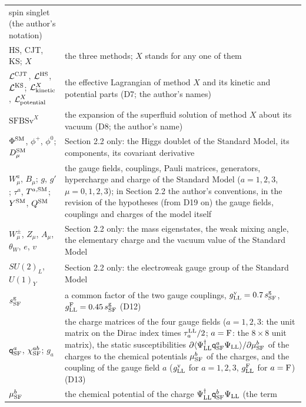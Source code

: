 \documentclass[
  10pt,
]{article}
\begin{document}
\begin{longtable}[]{@{}
  >{\raggedright\arraybackslash}p{}
  >{\raggedright\arraybackslash}p{}@{}}
spin singlet (the author's notation) \\
HS, CJT, KS; \(X\) & the three methods; \(X\) stands for any one of
them \\
\(\mathcal L^{\rm CJT}\), \(\mathcal L^{\rm HS}\),
\(\mathcal L^{\rm KS}\); \(\mathcal L^X_{\rm kinetic}\),
\(\mathcal L^X_{\rm potential}\) & the effective Lagrangian of method
\(X\) and its kinetic and potential parts (D7; the author's names) \\
\(\mathrm{SFBSv}^X\) & the expansion of the superfluid solution of
method \(X\) about its vacuum (D8; the author's name) \\
\(\Phi^{\rm SM}\), \(\phi^+\), \(\phi^0\); \(D^{\rm SM}_\mu\) & Section
2.2 only: the Higgs doublet of the Standard Model, its components, its
covariant derivative \\
\(W^a_\mu\), \(B_\mu\); \(g\), \(g'\); \(\tau^a\), \(T^{a,{\rm SM}}\);
\(Y^{\rm SM}\), \(Q^{\rm SM}\) & the gauge fields, couplings, Pauli
matrices, generators, hypercharge and charge of the Standard Model
(\(a=1,2,3\), \(\mu=0,1,2,3\)); in Section 2.2 the author's conventions,
in the revision of the hypotheses (from D19 on) the gauge fields,
couplings and charges of the model itself \\
\(W^\pm_\mu\), \(Z_\mu\), \(A_\mu\), \(\theta_W\), \(e\), \(v\) &
Section 2.2 only: the mass eigenstates, the weak mixing angle, the
elementary charge and the vacuum value of the Standard Model \\
\(SU(2)_L\), \(U(1)_Y\) & Section 2.2 only: the electroweak gauge group
of the Standard Model \\
\(s^{\rm g}_{\rm SF}\) & a common factor of the two gauge couplings,
\(g^{\rm v}_{\rm LL}=0.7\,s^{\rm g}_{\rm SF}\),
\(g^{\rm F}_{\rm LL}=0.45\,s^{\rm g}_{\rm SF}\) (D12) \\
\(\mathsf q^a_{\rm SF}\), \(\chi^{ab}_{\rm SF}\); \(g_a\) & the charge
matrices of the four gauge fields (\(a=1,2,3\): the unit matrix on the
Dirac index times \(\tau^{\rm LL}_a/2\); \(a={\rm F}\): the \(8\times8\)
unit matrix), the static susceptibilities
\(\partial\langle\Psi^\dagger_{\rm LL}\mathsf q^a_{\rm SF}\Psi_{\rm LL}\rangle/\partial\mu^b_{\rm SF}\)
of the charges to the chemical potentials \(\mu^b_{\rm SF}\) of the
charges, and the coupling of the gauge field \(a\)
(\(g^{\rm v}_{\rm LL}\) for \(a=1,2,3\), \(g^{\rm F}_{\rm LL}\) for
\(a={\rm F}\)) (D13) \\
\(\mu^b_{\rm SF}\) & the chemical potential of the charge
\(\Psi^\dagger_{\rm LL}\mathsf q^b_{\rm SF}\Psi_{\rm LL}\) (the term

\end{longtable}
\end{document}
